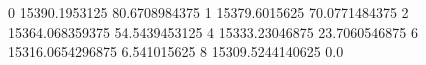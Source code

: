 0 15390.1953125 80.6708984375
1 15379.6015625 70.0771484375
2 15364.068359375 54.5439453125
4 15333.23046875 23.7060546875
6 15316.0654296875 6.541015625
8 15309.5244140625 0.0
